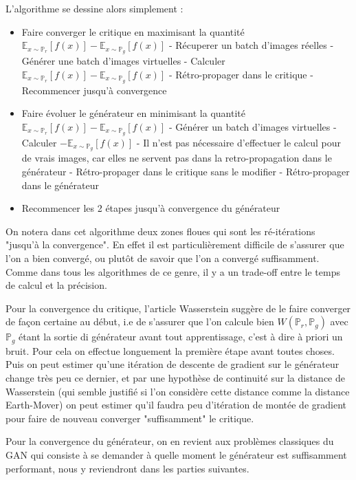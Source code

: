  L'algorithme se dessine alors simplement :
 \begin{itemize}
 \item Faire converger le critique en maximisant la quantité $\mathbb{E}_{x\sim\mathbb{P}_r}[f(x)] - \mathbb{E}_{x\sim\mathbb{P}_g}[f(x)] $
 \subitem - Récuperer un batch d'images réelles
 \subitem - Générer une batch d'images virtuelles
 \subitem - Calculer $\mathbb{E}_{x\sim\mathbb{P}_r}[f(x)] - \mathbb{E}_{x\sim\mathbb{P}_g}[f(x)] $
 \subitem - Rétro-propager dans le critique
 \subitem - Recommencer jusqu'à convergence
 \item Faire évoluer le générateur en minimisant la quantité $\mathbb{E}_{x\sim\mathbb{P}_r}[f(x)] - \mathbb{E}_{x\sim\mathbb{P}_g}[f(x)] $
 \subitem - Générer un batch d'images virtuelles
 \subitem - Calculer $- \mathbb{E}_{x\sim\mathbb{P}_g}[f(x)] $
 \subitem - Il n'est pas nécessaire d'effectuer le calcul pour de vrais images, car elles ne servent pas dans la retro-propagation dans le générateur
 \subitem - Rétro-propager dans le critique sans le modifier
 \subitem - Rétro-propager dans le générateur
 \item Recommencer les 2 étapes jusqu'à convergence du générateur
 \end{itemize}

 On notera dans cet algorithme deux zones floues qui sont les ré-itérations "jusqu'à la convergence". En effet il est particulièrement difficile de s'assurer que l'on a bien convergé, ou plutôt de savoir que l'on a convergé suffisamment. Comme dans tous les algorithmes de ce genre, il y a un trade-off entre le temps de calcul et la précision.

 Pour la convergence du critique, l'article Wasserstein \cite{arjovsky_wasserstein_2017} suggère de le faire converger de façon certaine au début, i.e de s'assurer que l'on calcule bien $W ( \mathbb{P}_r, \mathbb{P}_g ) $ avec $\mathbb{P}_g$ étant la sortie di générateur avant tout apprentissage, c'est à dire à priori un bruit. Pour cela on effectue longuement la première étape avant toutes choses. Puis on peut estimer qu'une itération de descente de gradient sur le générateur change très peu ce dernier, et par une hypothèse de continuité sur la distance de Wasserstein (qui semble justifié si l'on considère cette distance comme la distance Earth-Mover) on peut estimer qu'il faudra peu d'itération de montée de gradient pour faire de nouveau converger "suffisamment" le critique.

 Pour la convergence du générateur, on en revient aux problèmes classiques du GAN qui consiste à se demander à quelle moment le générateur est suffisamment performant, nous y reviendront dans les parties suivantes.


